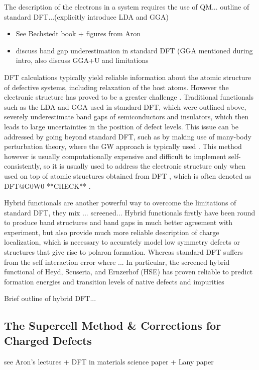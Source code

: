 The description of the electrons in a system requires the use of QM... outline of standard DFT...(explicitly introduce LDA and GGA)\\

\begin{itemize}
\item See Bechstedt book \cite{Bechstedt} + figures from Aron
\item discuss band gap underestimation in standard DFT (GGA mentioned during intro, also discuss GGA+U and limitations
\end{itemize}

DFT calculations typically yield reliable information about the atomic structure of defective systems, including relaxation of the host atoms. However the electronic structure has proved to be a greater challenge \cite{defects_tutorial}. Traditional functionals such as the LDA and GGA used in standard DFT, which were outlined above, severely underestimate band gaps of semiconductors and insulators, which then leads to large uncertainties in the position of defect levels. This issue can be addressed by going beyond standard DFT, such as by making use of many-body perturbation theory, where the GW approach is typically used \cite{defects_tutorial_19}. This method however is usually computationally expensive and difficult to implement self-consistently, so it is usually used to address the electronic structure only when used on top of atomic structures obtained from DFT \cite{defects_tutorial_20, defects_tutorial_21}, which is often denoted as DFT@G0W0 **CHECK** \cite{defects_tutorial}.

Hybrid functionals are another powerful way to overcome the limitations of standard DFT, they mix ... screened...
Hybrid functionals firstly have been round to produce band structures and band gaps in much better agreement with experiment, but also provide much more reliable description of charge localization, which is necessary to accurately model low symmetry defects or structures that give rise to polaron formation. Whereas standard DFT suffers from the self interaction error where ...
In particular, the screened hybrid functional of Heyd, Scuseria, and Ernzerhof (HSE) \cite{HSE} has proven reliable to predict formation energies and transition levels of native defects and impurities \cite{defects_tutorial}

Brief outline of hybrid DFT...


\subsection{The Supercell Method \& Corrections for Charged Defects}\label{supercell_section}
see Aron's lectures + DFT in materials science paper \cite{DFT_in_mat} + Lany paper\\

